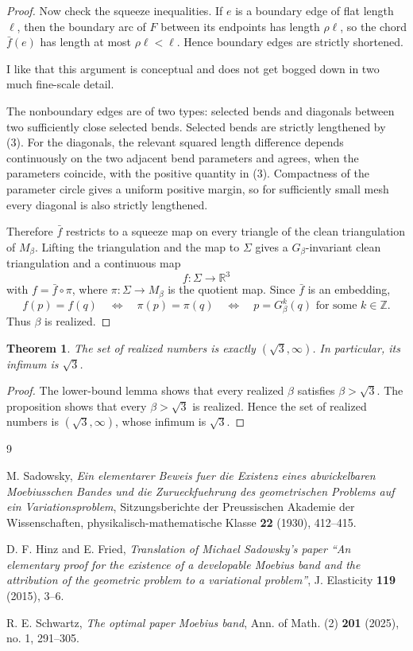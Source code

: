 \documentclass[12pt]{article}
\newtheorem{theorem}{Theorem}
\newcommand{\R}{\mathbb R}
\newcommand{\Z}{\mathbb Z}
\newcommand{\review}[1]{\begin{reviewbox}#1\end{reviewbox}}
\begin{document}
\begin{proof}
Now check the squeeze inequalities.  If \(e\) is a boundary edge of flat length \(\ell\), then the boundary arc of \(F\) between its endpoints has length \(\rho\ell\), so the chord \(\bar f(e)\) has length at most \(\rho\ell<\ell\).  Hence boundary edges are strictly shortened.


\review{I like that this argument is conceptual and does not get bogged down in two much fine-scale detail.}


The nonboundary edges are of two types: selected bends and diagonals between two sufficiently close selected bends.  Selected bends are strictly lengthened by (3).  For the diagonals, the relevant squared length difference depends continuously on the two adjacent bend parameters and agrees, when the parameters coincide, with the positive quantity in (3).  Compactness of the parameter circle gives a uniform positive margin, so for sufficiently small mesh every diagonal is also strictly lengthened.

Therefore \(\bar f\) restricts to a squeeze map on every triangle of the clean triangulation of \(M_\beta\).  Lifting the triangulation and the map to \(\Sigma\) gives a \(G_\beta\)-invariant clean triangulation and a continuous map
\[
f:\Sigma\to\R^3
\]
with \(f=\bar f\circ \pi\), where \(\pi:\Sigma\to M_\beta\) is the quotient map.  Since \(\bar f\) is an embedding,
\[
f(p)=f(q)\quad\Longleftrightarrow\quad \pi(p)=\pi(q)
\quad\Longleftrightarrow\quad p=G_\beta^k(q)\text{ for some }k\in\Z.
\]
Thus \(\beta\) is realized.
\end{proof}

\begin{theorem}
The set of realized numbers is exactly \((\sqrt3,\infty)\).  In particular, its infimum is \(\sqrt3\).
\end{theorem}

\begin{proof}
The lower-bound lemma shows that every realized \(\beta\) satisfies \(\beta>\sqrt3\).  The proposition shows that every \(\beta>\sqrt3\) is realized.  Hence the set of realized numbers is \((\sqrt3,\infty)\), whose infimum is \(\sqrt3\).
\end{proof}

\begin{thebibliography}{9}

M. Sadowsky,
\emph{Ein elementarer Beweis fuer die Existenz eines abwickelbaren Moebiusschen Bandes und die Zurueckfuehrung des geometrischen Problems auf ein Variationsproblem},
Sitzungsberichte der Preussischen Akademie der Wissenschaften, physikalisch-mathematische Klasse \textbf{22} (1930), 412--415.

D. F. Hinz and E. Fried,
\emph{Translation of Michael Sadowsky's paper ``An elementary proof for the existence of a developable Moebius band and the attribution of the geometric problem to a variational problem''},
J. Elasticity \textbf{119} (2015), 3--6.

R. E. Schwartz,
\emph{The optimal paper Moebius band},
Ann. of Math. (2) \textbf{201} (2025), no. 1, 291--305.

\end{thebibliography}
\end{document}
